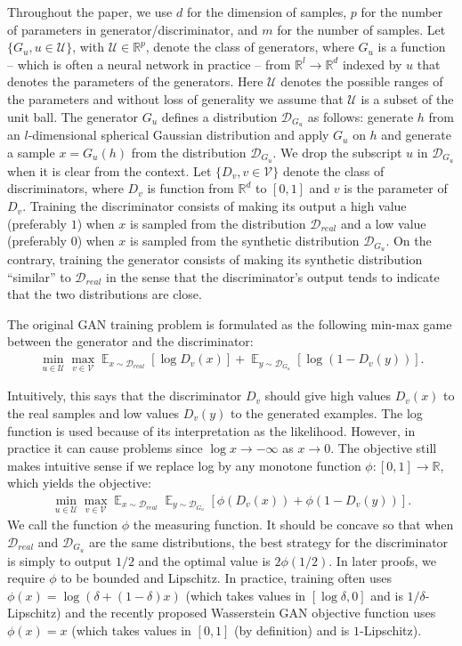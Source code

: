 \documentclass[10pt,twocolumn,letterpaper]{article}
\newcommand{\RR}{\mathbb{R}}
\newcommand{\g}{{G_u}}
\newcommand{\di}{{D_v}}
\newcommand{\U}{\mathcal{U}}
\newcommand{\D}{\mathcal{D}}
\newcommand{\V}{\mathcal{V}}
\newcommand{\E}{\mathbb{E}}
\begin{document}
Throughout the paper, we use $d$ for the dimension of samples, $p$ for the number of parameters in generator/discriminator, and $m$ for the number of samples. Let $\{G_u, u \in \mathcal{U}\}$, with $\mathcal{U} \in \RR^p$, denote the class of generators, where $\g$ is a function -- which is often a neural network in practice -- from $\RR^l \rightarrow \RR^d$ indexed by $u$ that denotes the parameters of the generators. Here $\U$ denotes the possible ranges of the parameters and without loss of generality we assume that $\U$ is a subset of the unit ball. The generator $\g$ defines a distribution $\D_\g$ as follows: generate $h$ from an $l$-dimensional spherical Gaussian distribution and apply $\g$ on $h$ and generate a sample $x = G_u(h)$ from the distribution $\D_\g$. We drop the subscript $u$ in $\D_\g$ when it is clear from the context. 
Let $\{\di, v \in \mathcal{V}\}$ denote the class of discriminators, where $\di$ is function from $\RR^d$ to $[0, 1]$ and $v$ is the parameter of $\di$. Training the discriminator consists of making its output a high value (preferably $1$) when $x$ is sampled from the distribution $\D_{real}$ and a low value (preferably $0$) when $x$ is sampled from the synthetic distribution $\D_\g$. On the contrary, training the generator consists of making its synthetic
distribution ``similar'' to $\D_{real}$ in the sense that the discriminator's output tends to indicate that the two distributions are close.


The original GAN training problem \cite{goodfellow2014generative} is formulated as the following min-max game between the generator and the discriminator:
\begin{align}
\min_{u\in \U} \max_{v\in \V} \mathop{\E}_{x\sim \D_{real}}[\log \di(x)]+\mathop{\E}_{y\sim \D_{\g}} [\log(1-\di(y))].\nonumber
\end{align}

Intuitively, this says that the discriminator $\di$ should give high values $\di(x)$ to the real samples and low values $\di(y)$ to the generated examples. The log function is used because of its interpretation as the likelihood. However, in practice it can cause problems since $\log x \rightarrow -\infty$ as $x \rightarrow 0$. The objective still makes intuitive sense if we replace log by any monotone function $\phi : [0, 1] \rightarrow \RR$, which yields the
objective:
\begin{align}
\min_{u\in \U} \max_{v\in \V} \mathop{\E}_{x\sim \D_{real}}\mathop{\E}_{y\sim \D_{\g}}[\phi (\di(x))+ \phi(1-\di(y))].\nonumber
\end{align}
We call the function $\phi$ the measuring function. It should be concave so that when $\D_{real}$ and $\D_{\g}$ are the same distributions, the best strategy for the discriminator is simply to output $1/2$ and the optimal value is $2\phi(1/2)$. In later proofs, we require $\phi$ to be bounded and Lipschitz. In practice, training often uses $\phi(x) = \log(\delta + (1 - \delta)x)$ (which takes values in $[\log \delta, 0]$ and is $1/\delta$-Lipschitz)
and the recently proposed Wasserstein GAN \cite{arjovsky2017wasserstein} objective function uses $\phi(x) = x$ {{(which takes values in $[0,1]$ (by definition) and is $1$-Lipschitz)}}.
\end{document}
